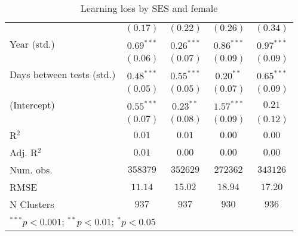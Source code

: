 \begin{table}
\begin{center}
\begin{tabular}{l c c c c}
                                     & $(0.17)$      & $(0.22)$      & $(0.26)$      & $(0.34)$      \\
Year (std.)                          & $0.69^{***}$  & $0.26^{***}$  & $0.86^{***}$  & $0.97^{***}$  \\
                                     & $(0.06)$      & $(0.07)$      & $(0.09)$      & $(0.09)$      \\
Days between tests (std.)            & $0.48^{***}$  & $0.55^{***}$  & $0.20^{**}$   & $0.65^{***}$  \\
                                     & $(0.05)$      & $(0.05)$      & $(0.07)$      & $(0.09)$      \\
(Intercept)                          & $0.55^{***}$  & $0.23^{**}$   & $1.57^{***}$  & $0.21$        \\
                                     & $(0.07)$      & $(0.08)$      & $(0.09)$      & $(0.12)$      \\
\hline
R$^2$                                & $0.01$        & $0.01$        & $0.00$        & $0.00$        \\
Adj. R$^2$                           & $0.01$        & $0.00$        & $0.00$        & $0.00$        \\
Num. obs.                            & $358379$      & $352629$      & $272362$      & $343126$      \\
RMSE                                 & $11.14$       & $15.02$       & $18.94$       & $17.20$       \\
N Clusters                           & $937$         & $937$         & $930$         & $936$         \\
\hline
\multicolumn{5}{l}{\scriptsize{$^{***}p<0.001$; $^{**}p<0.01$; $^{*}p<0.05$}}
\end{tabular}
\caption{Learning loss by SES and female}
\label{table_ses_female}
\end{center}
\end{table}
